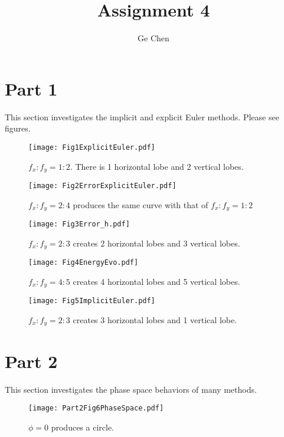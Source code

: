 \documentclass[8pt]{article}
\begin{document}
\title{Assignment 4}
\author{Ge Chen} 
\maketitle
\section{Part 1} 

This section investigates the implicit and explicit Euler methods. Please see figures. 

\begin{figure}[H] %
\centering
\texttt{[image: Fig1ExplicitEuler.pdf]}
\caption{$f_{x}:f_{y}=1:2$. There is 1 horizontal lobe and 2 vertical lobes.}
\label{fig:1-to-2}
\end{figure} 

\begin{figure}[H]
\centering
\texttt{[image: Fig2ErrorExplicitEuler.pdf]}
\caption{$f_{x}:f_{y}=2:4$ produces the same curve with that of $f_{x}:f_{y}=1:2$} 
\label{fig:2-to-4}
\end{figure} 

\begin{figure}[H]
\centering
\texttt{[image: Fig3Error\_h.pdf]}
\caption{$f_{x}:f_{y}=2:3$ creates 2 horizontal lobes and 3 vertical lobes.} 
\label{fig:2-to-3}
\end{figure} 

\begin{figure}[H]
\centering
\texttt{[image: Fig4EnergyEvo.pdf]}
\caption{$f_{x}:f_{y}=4:5$ creates 4 horizontal lobes and 5 vertical lobes.} 
\label{fig:4-to-5}
\end{figure} 

\begin{figure}[H]
\centering
\texttt{[image: Fig5ImplicitEuler.pdf]}
\caption{$f_{x}:f_{y}=2:3$ creates 3 horizontal lobes and 1 vertical lobe.} 
\label{fig:3-to-1}
\end{figure} 

\section{Part 2} 
This section investigates the phase space behaviors of many methods. 

\begin{figure}[H]
\centering
\texttt{[image: Part2Fig6PhaseSpace.pdf]}
\caption{$\phi = 0$ produces a circle.} 
\label{fig:phi0}
\end{figure} 
\end{document}
